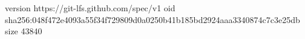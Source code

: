 version https://git-lfs.github.com/spec/v1
oid sha256:048f472e4093a55f34f729809d0a0250b41b185bd2924aaa3340874c7c3e25db
size 43840

